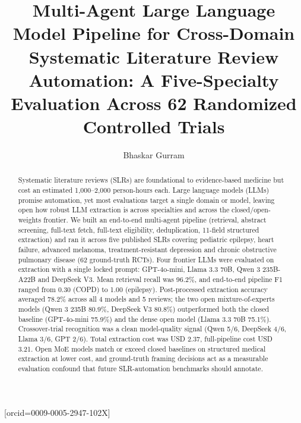 \documentclass[a4paper,fleqn]{cas-sc}
\begin{document}
\let\WriteBookmarks\relax
\def\floatpagepagefraction{1}
\def\textpagefraction{.001}


\title[mode = title]{Multi-Agent Large Language Model Pipeline for
Cross-Domain Systematic Literature Review Automation: A Five-Specialty
Evaluation Across 62 Randomized Controlled Trials}

\author[1]{Bhaskar Gurram}[orcid=0009-0005-2947-102X]
\cormark[1]

\begin{abstract}
Systematic literature reviews (SLRs) are foundational to evidence-based
medicine but cost an estimated 1{,}000--2{,}000 person-hours each.
Large language models (LLMs) promise automation, yet most evaluations
target a single domain or model, leaving open how robust LLM extraction is
across specialties and across the closed/open-weights frontier. We built
an end-to-end multi-agent pipeline (retrieval, abstract screening,
full-text fetch, full-text eligibility, deduplication, 11-field structured
extraction) and ran it across five published SLRs covering pediatric
epilepsy, heart failure, advanced melanoma, treatment-resistant depression
and chronic obstructive pulmonary disease (62 ground-truth RCTs).
Four frontier LLMs were evaluated on extraction with a single locked
prompt: GPT-4o-mini, Llama 3.3 70B, Qwen 3 235B-A22B and DeepSeek V3.
Mean retrieval recall was 96.2\%, and end-to-end pipeline F1 ranged
from 0.30 (COPD) to 1.00 (epilepsy). Post-processed extraction accuracy
averaged 78.2\% across all 4 models and 5 reviews; the two open
mixture-of-experts models (Qwen 3 235B 80.9\%, DeepSeek V3 80.8\%)
outperformed both the closed baseline (GPT-4o-mini 75.9\%) and the dense
open model (Llama 3.3 70B 75.1\%). Crossover-trial recognition was a
clean model-quality signal (Qwen 5/6, DeepSeek 4/6, Llama 3/6, GPT 2/6).
Total extraction cost was USD 2.37, full-pipeline cost USD 3.21. Open
MoE models match or exceed closed baselines on structured medical
extraction at lower cost, and ground-truth framing decisions act as a
measurable evaluation confound that future SLR-automation benchmarks
should annotate.
\end{abstract}
\end{document}
